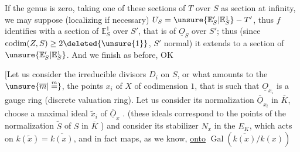 If the genus is zero, taking one of these sections of $T$ over $S$ as section at infinity, we may suppose (localizing if necessary) $U_S=\unsure{\mathbb E'_S|\mathbb E^1_S}-T'$, thus $f$ identifies with a section of $\mathbb E^1_S$ over $S'$, that is of $\underline O_S$ over $S'$; thus (since $\operatorname{codim}(Z,S)\geq2\deleted{\unsure{1}}$, $S'$ normal) it extends to a section of $\unsure{\mathbb E'_S|\mathbb E^1_S}$. And we finish as before, OK

[Let us consider  the irreducible divisors $D_i$ on $S$, or what amounts to the $\unsure{\overline m|\overset{m}{=}}$, the points $x_i$ of $X$ of codimension $1$, that is such that $\underline O_{x_i}$ is a gauge ring (discrete valuation ring). Let us consider its normalization $\overline{\underline O}_{x_i}$ in $\overline K$, choose a maximal ideal $\widetilde x_i$ of $\overline{\underline O}_x$ . (these ideals correspond to the points of the normalization $\widetilde S$ of $S$ in $\overline K$ ) and consider its stabilizer $N_x$ in the $E_K$, which acts  on $k(\widetilde x)=\overline{k(x)}$, and in fact maps, as we know, \uline{onto} $\operatorname{Gal}(\overline{k(x)}/k(x))$
